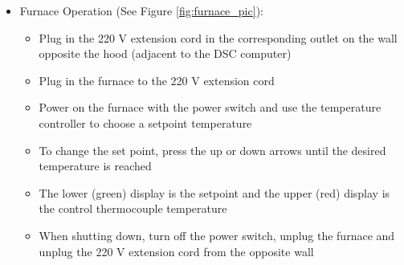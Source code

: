 \documentclass[letterpaper,11pt]{article}
\begin{document}
\begin{itemize}
    \item Furnace Operation (See Figure \ref{fig:furnace_pic}):
        \begin{itemize}
        \item Plug in the 220 V extension cord in the corresponding outlet on 
        the wall opposite the hood (adjacent to the DSC computer)
        \item Plug in the furnace to the 220 V extension cord
        \item Power on the furnace with the power switch and use the temperature
            controller to choose a setpoint temperature
        \item To change the set point, press the up or down arrows until 
            the desired temperature is reached
        \item The lower (green) display is the setpoint and the upper 
            (red) display is the control thermocouple temperature
        \item When shutting down, turn off the power switch, unplug the 
            furnace and unplug the 220 V extension cord from the opposite wall
        \end{itemize}
    \end{itemize}

        
\end{document}
